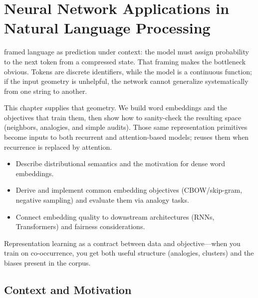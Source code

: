 \section{Neural Network Applications in Natural Language Processing}\label{chap:nlp}
\graphicspath{{assets/lec8/}{assets/lec14/}}

 framed language as prediction under context: the model must assign probability to the next token from a compressed state. That framing makes the bottleneck obvious. Tokens are discrete identifiers, while the model is a continuous function; if the input geometry is unhelpful, the network cannot generalize systematically from one string to another.

This chapter supplies that geometry. We build word embeddings and the objectives that train them, then show how to sanity\hyp{}check the resulting space (neighbors, analogies, and simple audits). Those same representation primitives become inputs to both recurrent and attention\hyp{}based models;  reuses them when recurrence is replaced by attention.

\begin{tcolorbox}[summarybox, title={Learning Outcomes}]
\begin{itemize}
    \item Describe distributional semantics and the motivation for dense word embeddings.
    \item Derive and implement common embedding objectives (CBOW/skip-gram, negative sampling) and evaluate them via analogy tasks.
    \item Connect embedding quality to downstream architectures (RNNs, Transformers) and fairness considerations.
\end{itemize}
\end{tcolorbox}

\begin{tcolorbox}[summarybox, title={Design motif}]
Representation learning as a contract between data and objective---when you train on co-occurrence, you get both useful structure (analogies, clusters) and the biases present in the corpus.
\end{tcolorbox}

\subsection{Context and Motivation}
\label{sec:nlp_context_and_motivation}

